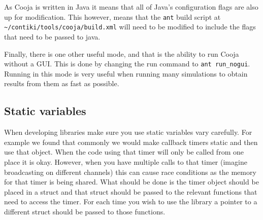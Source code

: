 As Cooja is written in Java \cite{?} it means that all of Java's configuration flags are also up for modification. This however, means that the \verb|ant| build script at \verb|~/contiki/tools/cooja/build.xml| will need to be modified to include the flags that need to be passed to java.

Finally, there is one other useful mode, and that is the ability to run Cooja without a GUI. This is done by changing the run command to \verb|ant run_nogui|. Running in this mode is very useful when running many simulations to obtain results from them as fast as possible.


\subsection{Static variables}

When developing libraries make sure you use static variables vary carefully. For example we found that commonly we would make callback timers static and then use that object. When the code using that timer will only be called from one place it is okay. However, when you have multiple calls to that timer (imagine broadcasting on different channels) this can cause race conditions as the memory for that timer is being shared. What should be done is the timer object should be placed in a struct and that struct should be passed to the relevant functions that need to access the timer. For each time you wish to use the library a pointer to a different struct should be passed to those functions.


